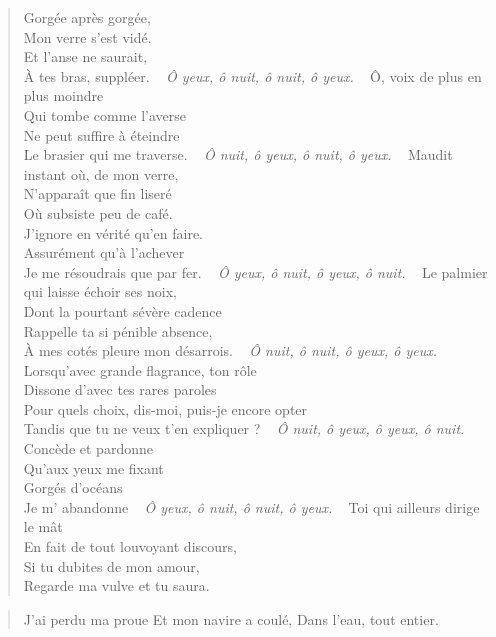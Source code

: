 \begin{verse}
Gorgée après gorgée,\\
Mon verre s’est vidé.\\
Et l’anse ne saurait,\\
À tes bras, suppléer.
~
\emph{Ô yeux, ô nuit, ô nuit, ô yeux.}
~
Ô, voix de plus en plus moindre\\
Qui tombe comme l’averse\\
Ne peut suffire à éteindre\\
Le brasier qui me traverse.
~
\emph{Ô nuit, ô yeux, ô nuit, ô yeux.}
~
Maudit instant où, de mon verre,\\
N’apparaît que fin liseré\\
Où subsiste peu de café.\\
J’ignore en vérité qu’en faire.\\
Assurément qu’à l’achever\\
Je me résoudrais que par fer.
~
\emph{Ô yeux, ô nuit, ô yeux, ô nuit.}
~
Le palmier qui laisse échoir ses noix,\\
Dont la pourtant sévère  cadence\\
Rappelle ta si pénible absence,\\
À mes cotés pleure mon désarrois.
~
\emph{Ô nuit, ô nuit, ô yeux, ô yeux.}
~
Lorsqu’avec grande flagrance, ton rôle\\
Dissone d’avec tes rares paroles\\
Pour quels choix, dis-moi, puis-je encore opter\\
Tandis que tu ne veux t’en expliquer ?
~
\emph{Ô nuit, ô yeux, ô yeux, ô nuit.}
~
Concède et pardonne\\
Qu’aux yeux me fixant\\
Gorgés d’océans\\
Je m’ abandonne
~
\emph{Ô yeux, ô nuit, ô nuit, ô yeux.}
~
Toi qui ailleurs dirige le mât\\
En fait de tout louvoyant discours,\\
Si tu dubites de mon amour,\\
Regarde ma vulve et tu saura.
\end{verse}

\begin{verse}
J’ai perdu ma proue
Et mon navire a coulé,
Dans l’eau, tout entier.
\end{verse}

